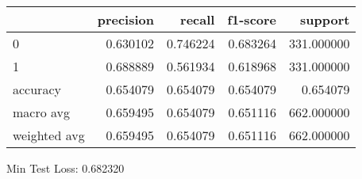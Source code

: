 \begin{tabular}{lrrrr}
\toprule
{} &  precision &    recall &  f1-score &     support \\
\midrule
0            &   0.630102 &  0.746224 &  0.683264 &  331.000000 \\
1            &   0.688889 &  0.561934 &  0.618968 &  331.000000 \\
accuracy     &   0.654079 &  0.654079 &  0.654079 &    0.654079 \\
macro avg    &   0.659495 &  0.654079 &  0.651116 &  662.000000 \\
weighted avg &   0.659495 &  0.654079 &  0.651116 &  662.000000 \\
\bottomrule
\end{tabular}

Min Test Loss: 0.682320